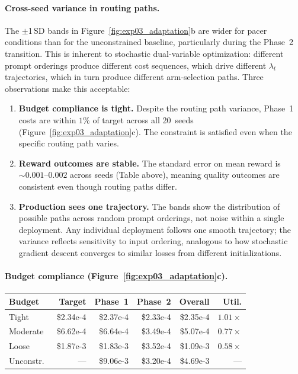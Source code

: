 \paragraph{Cross-seed variance in routing paths.}
The $\pm$1\,SD bands in Figure~\ref{fig:exp03_adaptation}b are
wider for pacer conditions than for the unconstrained baseline,
particularly during the Phase~2 transition.
This is inherent to stochastic dual-variable optimization: different
prompt orderings produce different cost sequences, which drive
different $\lambda_t$ trajectories, which in turn produce different
arm-selection paths.  Three observations make this acceptable:
\begin{enumerate}[nosep,leftmargin=*]
  \item \textbf{Budget compliance is tight.}
    Despite the routing path variance, Phase~1 costs are within
    $1\%$ of target across all 20~seeds
    (Figure~\ref{fig:exp03_adaptation}c).  The constraint is
    satisfied even when the specific routing path varies.
  \item \textbf{Reward outcomes are stable.}
    The standard error on mean reward is ${\sim}0.001$--$0.002$
    across seeds (Table above), meaning quality outcomes are
    consistent even though routing paths differ.
  \item \textbf{Production sees one trajectory.}
    The bands show the distribution of possible paths across random
    prompt orderings, not noise within a single deployment.  Any
    individual deployment follows one smooth trajectory; the
    variance reflects sensitivity to input ordering, analogous to
    how stochastic gradient descent converges to similar losses from
    different initializations.
\end{enumerate}

\paragraph{Budget compliance (Figure~\ref{fig:exp03_adaptation}c).}

\begin{center}
\small
\begin{tabular}{@{}lrrrrr@{}}
\toprule
\textbf{Budget} & \textbf{Target} & \textbf{Phase~1} & \textbf{Phase~2} & \textbf{Overall} & \textbf{Util.} \\
\midrule
Tight    & \$2.34e-4 & \$2.37e-4 & \$2.33e-4 & \$2.35e-4 & $1.01\times$ \\
Moderate & \$6.62e-4 & \$6.64e-4 & \$3.49e-4 & \$5.07e-4 & $0.77\times$ \\
Loose    & \$1.87e-3 & \$1.83e-3 & \$3.52e-4 & \$1.09e-3 & $0.58\times$ \\
\midrule
Unconstr.\ & ---     & \$9.06e-3 & \$3.20e-4 & \$4.69e-3 & --- \\
\bottomrule
\end{tabular}
\end{center}

